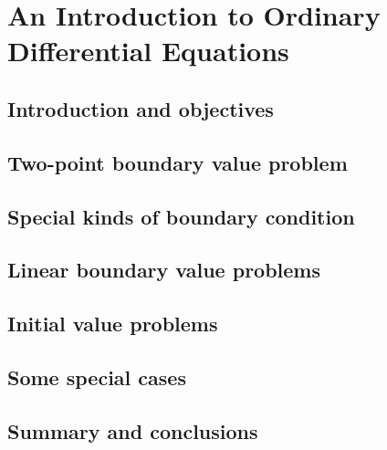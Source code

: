 \chapter{An Introduction to Ordinary Differential Equations}

\section{Introduction and objectives}

\section{Two-point boundary value problem}

\section{Special kinds of boundary condition}

\section{Linear boundary value problems}

\section{Initial value problems}

\section{Some special cases}

\section{Summary and conclusions}